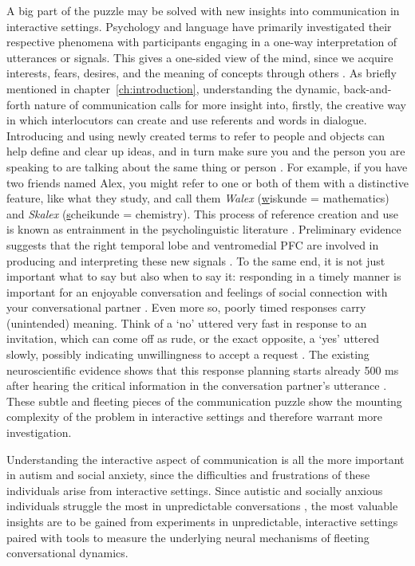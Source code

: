 A big part of the puzzle may be solved with new insights into communication in interactive settings. Psychology and language have primarily investigated their respective phenomena with participants engaging in a one-way interpretation of utterances or signals. This gives a one-sided view of the mind, since we acquire interests, fears, desires, and the meaning of concepts through others \citep{zaki2011,safran2014,defelice2023}. As briefly mentioned in chapter~\ref{ch:introduction}, understanding the dynamic, back-and-forth nature of communication calls for more insight into, firstly, the creative way in which interlocutors can create and use referents and words in dialogue. Introducing and using newly created terms to refer to people and objects can help define and clear up ideas, and in turn make sure you and the person you are speaking to are talking about the same thing or person \citep{brennan1996}. For example, if you have two friends named Alex, you might refer to one or both of them with a distinctive feature, like what they study, and call them \textit{Walex} (\underline{w}iskunde = mathematics) and \textit{Skalex} (\underline{s}cheikunde = chemistry). This process of reference creation and use is known as entrainment in the psycholinguistic literature \citep{brennan2010}. Preliminary evidence suggests that the right temporal lobe and ventromedial PFC are involved in producing and interpreting these new signals \citep{stolk2013neural}. To the same end, it is not just important what to say but also when to say it: responding in a timely manner is important for an enjoyable conversation and feelings of social connection with your conversational partner \citep{templeton2022}. Even more so, poorly timed responses carry (unintended) meaning. Think of a `no' uttered very fast in response to an invitation, which can come off as rude, or the exact opposite, a `yes' uttered slowly, possibly indicating unwillingness to accept a request \citep{bogels2015never,kendrick2015}. The existing neuroscientific evidence shows that this response planning starts already 500 ms after hearing the critical information in the conversation partner's utterance \citep{bogels2015neural}. These subtle and fleeting pieces of the communication puzzle show the mounting complexity of the problem in interactive settings and therefore warrant more investigation. 

Understanding the interactive aspect of communication is all the more important in autism and social anxiety, since the difficulties and frustrations of these individuals arise from interactive settings. Since autistic and socially anxious individuals struggle the most in unpredictable conversations \citep{roeyers2001,ponnet2008,pilkonis1977,thompson2002}, the most valuable insights are to be gained from experiments in unpredictable, interactive settings paired with tools to measure the underlying neural mechanisms of fleeting conversational dynamics. 

